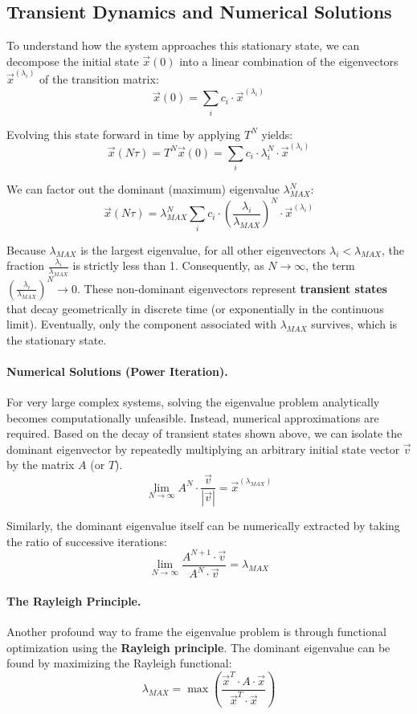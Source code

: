 \subsection{Transient Dynamics and Numerical Solutions}

To understand how the system approaches this stationary state, we can decompose the initial state $\vec{x}(0)$ into a linear combination of the eigenvectors $\vec{x}^{(\lambda_i)}$ of the transition matrix:
\[
    \vec{x}(0) = \sum_i c_i \cdot \vec{x}^{(\lambda_i)}
\]

Evolving this state forward in time by applying $T^N$ yields:
\[
    \vec{x}(N\tau) = T^N \vec{x}(0) = \sum_i c_i \cdot \lambda_i^N \cdot \vec{x}^{(\lambda_i)}
\]

We can factor out the dominant (maximum) eigenvalue $\lambda_{MAX}^N$:
\[
    \vec{x}(N\tau) = \lambda_{MAX}^N \sum_i c_i \cdot \left( \frac{\lambda_i}{\lambda_{MAX}} \right)^N \cdot \vec{x}^{(\lambda_i)}
\]

Because $\lambda_{MAX}$ is the largest eigenvalue, for all other eigenvectors $\lambda_i < \lambda_{MAX}$, the fraction $\frac{\lambda_i}{\lambda_{MAX}}$ is strictly less than 1. Consequently, as $N \to \infty$, the term $\left( \frac{\lambda_i}{\lambda_{MAX}} \right)^N \to 0$. These non-dominant eigenvectors represent \textbf{transient states} that decay geometrically in discrete time (or exponentially in the continuous limit). Eventually, only the component associated with $\lambda_{MAX}$ survives, which is the stationary state.

\paragraph{Numerical Solutions (Power Iteration).}
For very large complex systems, solving the eigenvalue problem analytically becomes computationally unfeasible. Instead, numerical approximations are required. Based on the decay of transient states shown above, we can isolate the dominant eigenvector by repeatedly multiplying an arbitrary initial state vector $\vec{v}$ by the matrix $A$ (or $T$).
\[
    \lim_{N \to \infty} A^N \cdot \frac{\vec{v}}{|\vec{v}|} = \vec{x}^{(\lambda_{MAX})}
\]

Similarly, the dominant eigenvalue itself can be numerically extracted by taking the ratio of successive iterations:
\[
    \lim_{N \to \infty} \frac{A^{N+1} \cdot \vec{v}}{A^N \cdot \vec{v}} = \lambda_{MAX}
\]


\paragraph{The Rayleigh Principle.}
Another profound way to frame the eigenvalue problem is through functional optimization using the \textbf{Rayleigh principle}. The dominant eigenvalue can be found by maximizing the Rayleigh functional:
\[
    \lambda_{MAX} = \max \left( \frac{\vec{x}^T \cdot A \cdot \vec{x}}{\vec{x}^T \cdot \vec{x}} \right)
\]

